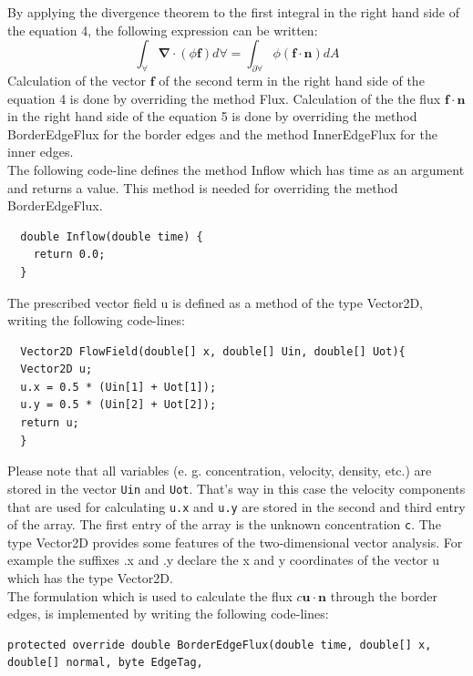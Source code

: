\documentclass[11pt,twoside,a4paper]{fdyartcl}
\begin{document}
{{\begin{equation}
\end{equation}
By applying the divergence theorem to the first integral in the right hand side of the equation 4, the following expression can be written:
\begin{equation}
\int_\forall\mathbf{\nabla}\cdot\left(\phi\mathbf{f}\right)d\forall=\int_{\partial\forall}\phi\left(\mathbf{f}\cdot\mathbf{n}\right)dA
\end{equation}
Calculation of the vector $\mathbf{f}$ of the second term in the right hand side of the equation 4 is done by overriding the method {\scriptsize Flux}. Calculation of the the flux $\mathbf{f}\cdot\mathbf{n}$ in the right hand side of the equation 5 is done by overriding the method {\scriptsize BorderEdgeFlux} for the border edges and the method {\scriptsize InnerEdgeFlux} for the inner edges.\\
The following code-line defines the method {\scriptsize Inflow} which has {\scriptsize time} as an argument and returns a value. This method is needed for overriding the method {\scriptsize BorderEdgeFlux}.
{\scriptsize \begin{verbatim}
  double Inflow(double time) {
    return 0.0;
  }
\end{verbatim}}
The prescribed vector field {\scriptsize u} is defined as a method of the type {\scriptsize Vector2D}, writing the following code-lines:
{\scriptsize \begin{verbatim}
  Vector2D FlowField(double[] x, double[] Uin, double[] Uot){
  Vector2D u;
  u.x = 0.5 * (Uin[1] + Uot[1]);
  u.y = 0.5 * (Uin[2] + Uot[2]);
  return u;
  }
\end{verbatim}}
Please note that all variables (e. g. concentration, velocity, density, etc.) are stored in the vector \verb|Uin| and \verb|Uot|. That's way in this case the velocity components that are used for calculating \verb|u.x| and \verb|u.y| are stored in the second and third entry of the array. The first entry of the array is the unknown concentration \verb|c|. The type {\scriptsize Vector2D} provides some features of the two-dimensional vector analysis. For example the suffixes {\scriptsize .x} and {\scriptsize .y} declare the x and y coordinates of the vector {\scriptsize u} which has the type {\scriptsize Vector2D}.\\
The formulation which is used to calculate the flux $c\mathbf{u}\cdot\mathbf{n}$ through the border edges, is implemented by writing the following code-lines:
{\scriptsize \begin{verbatim}
protected override double BorderEdgeFlux(double time, double[] x, double[] normal, byte EdgeTag, 

\end{verbatim}}}}
\end{document}
